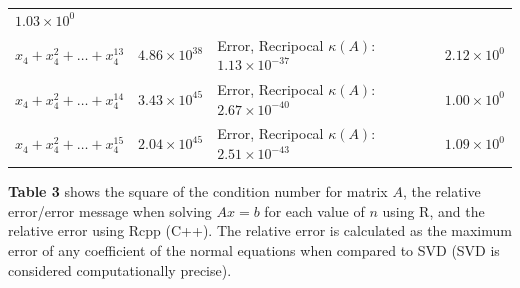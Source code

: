 \documentclass[
]{article}
\begin{document}
\begin{longtable}[]{@{}llll@{}}
\begin{minipage}[t]{0.15\columnwidth}
\(1.03 \times 10^{0}\)\strut
\end{minipage}\tabularnewline
\begin{minipage}[t]{0.23\columnwidth}\raggedright
\(x_{4}+x_{4}^{2}+\dots+x_{4}^{13}\)\strut
\end{minipage} & \begin{minipage}[t]{0.15\columnwidth}\raggedright
\(4.86 \times 10^{38}\)\strut
\end{minipage} & \begin{minipage}[t]{0.36\columnwidth}\raggedright
Error, Recripocal \(\kappa(A)\): \(1.13 \times 10^{-37}\)\strut
\end{minipage} & \begin{minipage}[t]{0.15\columnwidth}\raggedright
\(2.12 \times 10^{0}\)\strut
\end{minipage}\tabularnewline
\begin{minipage}[t]{0.23\columnwidth}\raggedright
\(x_{4}+x_{4}^{2}+\dots+x_{4}^{14}\)\strut
\end{minipage} & \begin{minipage}[t]{0.15\columnwidth}\raggedright
\(3.43 \times 10^{45}\)\strut
\end{minipage} & \begin{minipage}[t]{0.36\columnwidth}\raggedright
Error, Recripocal \(\kappa(A)\): \(2.67 \times 10^{-40}\)\strut
\end{minipage} & \begin{minipage}[t]{0.15\columnwidth}\raggedright
\(1.00 \times 10^{0}\)\strut
\end{minipage}\tabularnewline
\begin{minipage}[t]{0.23\columnwidth}\raggedright
\(x_{4}+x_{4}^{2}+\dots+x_{4}^{15}\)\strut
\end{minipage} & \begin{minipage}[t]{0.15\columnwidth}\raggedright
\(2.04 \times 10^{45}\)\strut
\end{minipage} & \begin{minipage}[t]{0.36\columnwidth}\raggedright
Error, Recripocal \(\kappa(A)\): \(2.51 \times 10^{-43}\)\strut
\end{minipage} & \begin{minipage}[t]{0.15\columnwidth}\raggedright
\(1.09 \times 10^{0}\)\strut
\end{minipage}\tabularnewline
\bottomrule
\end{longtable}

\textbf{Table 3} shows the square of the condition number for matrix
\(A\), the relative error/error message when solving \(Ax = b\) for each
value of \(n\) using R, and the relative error using Rcpp (C++). The
relative error is calculated as the maximum error of any coefficient of
the normal equations when compared to SVD (SVD is considered
computationally precise).
\end{document}
